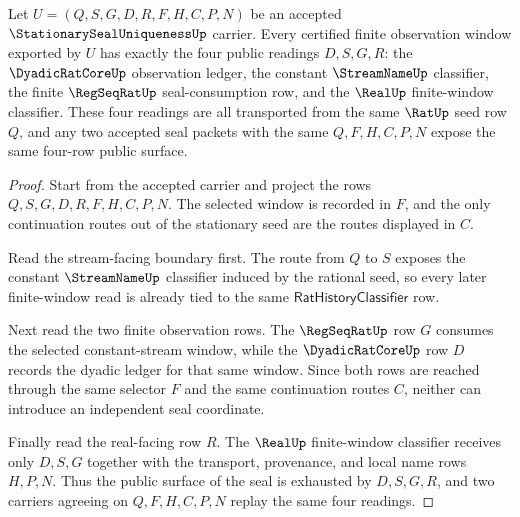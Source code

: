 \begin{theorem}
\label{thm:stationary-seal-uniqueness-four-row-exhaustion}
Let $U=(Q,S,G,D,R,F,H,C,P,N)$ be an accepted $\StationarySealUniquenessUp$ carrier. Every certified finite observation window exported by $U$ has exactly the four public readings $D,S,G,R$: the $\DyadicRatCoreUp$ observation ledger, the constant $\StreamNameUp$ classifier, the finite $\RegSeqRatUp$ seal-consumption row, and the $\RealUp$ finite-window classifier. These four readings are all transported from the same $\RatUp$ seed row $Q$, and any two accepted seal packets with the same $Q,F,H,C,P,N$ expose the same four-row public surface.
\end{theorem}
\begin{proof}
Start from the accepted carrier and project the rows $Q,S,G,D,R,F,H,C,P,N$. The selected window is recorded in $F$, and the only continuation routes out of the stationary seed are the routes displayed in $C$.

Read the stream-facing boundary first. The route from $Q$ to $S$ exposes the constant $\StreamNameUp$ classifier induced by the rational seed, so every later finite-window read is already tied to the same $\mathsf{RatHistoryClassifier}$ row.

Next read the two finite observation rows. The $\RegSeqRatUp$ row $G$ consumes the selected constant-stream window, while the $\DyadicRatCoreUp$ row $D$ records the dyadic ledger for that same window. Since both rows are reached through the same selector $F$ and the same continuation routes $C$, neither can introduce an independent seal coordinate.

Finally read the real-facing row $R$. The $\RealUp$ finite-window classifier receives only $D,S,G$ together with the transport, provenance, and local name rows $H,P,N$. Thus the public surface of the seal is exhausted by $D,S,G,R$, and two carriers agreeing on $Q,F,H,C,P,N$ replay the same four readings.
\end{proof}



